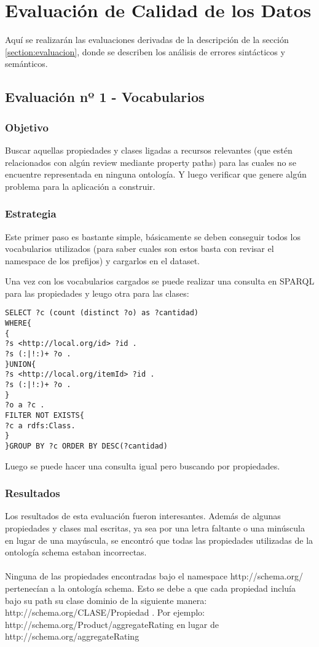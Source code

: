 \chapter{Evaluación de Calidad de los Datos}
\label{chapter:evaluacion}

Aquí se realizarán las evaluaciones derivadas de la descripción de la sección \ref{section:evaluacion}, 
donde se describen los análisis de errores sintácticos y semánticos.

\section{Evaluación nº 1 - Vocabularios}
\label{section:evaluacion-vocabularios}

\subsection*{Objetivo}
Buscar aquellas propiedades y clases ligadas a recursos relevantes (que estén relacionados con algún review mediante property paths) 
para las cuales no se encuentre representada en ninguna ontología. Y luego verificar que genere algún problema para la aplicación a construir.

\subsection*{Estrategia}
Este primer paso es bastante simple, básicamente se deben conseguir todos los vocabularios utilizados (para saber cuales son estos basta con revisar el namespace 
de los prefijos) y cargarlos en el dataset.

Una vez con los vocabularios cargados se puede realizar una consulta en SPARQL para las propiedades y leugo otra para las clases:

\begin{lstlisting}[frame=single]
SELECT ?c (count (distinct ?o) as ?cantidad)
WHERE{
{
?s <http://local.org/id> ?id .
?s (:|!:)+ ?o .
}UNION{
?s <http://local.org/itemId> ?id .
?s (:|!:)+ ?o .
}
?o a ?c .
FILTER NOT EXISTS{
?c a rdfs:Class.
}
}GROUP BY ?c ORDER BY DESC(?cantidad)
\end{lstlisting}

\noindent Luego se puede hacer una consulta igual pero buscando por propiedades.

\subsection*{Resultados}
Los resultados de esta evaluación fueron interesantes. Además de algunas propiedades y clases mal escritas, ya sea por una letra faltante o una minúscula en lugar 
de una mayúscula, se encontró que todas las propiedades utilizadas de la ontología schema estaban incorrectas.
\\\\
Ninguna de las propiedades encontradas bajo el namespace http://schema.org/ pertenecían a la ontología schema.
Esto se debe a que cada propiedad incluía bajo su path su clase dominio de la siguiente manera: http://schema.org/CLASE/Propiedad .
Por ejemplo:
http://schema.org/Product/aggregateRating en lugar de http://schema.org/aggregateRating

